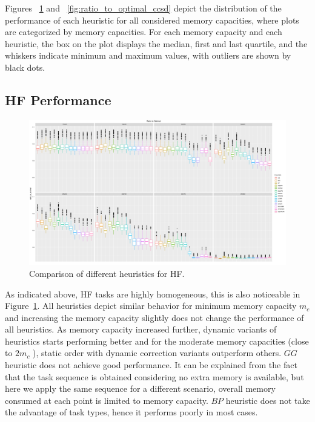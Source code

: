 \documentclass[sigconf]{acmart}
\begin{document}
{	
	Figures ~\ref{fig:ratio_to_optimal_hf} and ~\ref{fig:ratio_to_optimal_ccsd} depict the distribution of the performance  of each heuristic for all considered memory capacities, where plots are categorized by memory capacities. For each memory capacity and each heuristic, the box on the plot displays the median, first and last quartile, and the whiskers indicate minimum and maximum values, with outliers are shown by black dots.
	\subsection{HF Performance}	
	\begin{figure}[htb]
	\includegraphics[scale=0.25]{./all-binpack/ratio_to_optimal_selected_hf.pdf}
	\caption{Comparison of different heuristics for HF.}
	\label{fig:ratio_to_optimal_hf}
\end{figure}
	As indicated above, HF tasks are highly homogeneous, this is also noticeable in Figure~\ref{fig:ratio_to_optimal_hf}. All heuristics depict similar behavior for minimum memory capacity $m_c$  and  increasing the memory capacity slightly does not change the performance of all heuristics. As memory capacity increased further, dynamic variants of heuristics starts performing better and for the moderate memory capacities (close to $2m_c$ ), static order with dynamic correction variants outperform others. $GG$ heuristic does not achieve good performance. It can be explained from the fact that the task sequence is obtained considering no extra memory is available, but here we apply the same sequence for a different scenario,  overall memory consumed at each point is limited to memory capacity. $BP$ heuristic does not take the advantage of task types, hence it performs poorly in most cases.
	
}
\end{document}
